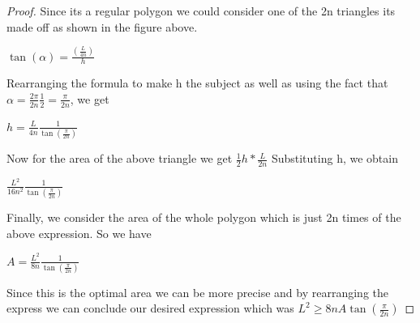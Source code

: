 \documentclass[a4paper]{book}
\numberwithin{theorem}{section}%
\begin{document}
\begin{proof}
        Since its a regular polygon we could consider one of the 2n triangles its made off as shown in the figure above. 
    \begin{center}
        $\displaystyle \tan(\alpha)=\frac{(\frac{L}{4n})}{h}$
    \end{center}
        Rearranging the formula to make h the subject as well as using the fact that $\alpha=\frac{2\pi}{2n} \frac{1}{2}=\frac{\pi}{2n}$, we get 
    \begin{center}
        $\displaystyle h=\frac{L}{4n} \frac{1}{\tan(\frac{\pi}{2n})}$
    \end{center}
    Now for the area of the above triangle we get $\displaystyle \frac{1}{2}h*\frac{L}{2n}$
        Substituting h, we obtain
    \begin{center}
        $\displaystyle \frac{L^{2}}{16n^{2}} \frac{1}{\tan(\frac{\pi}{2n})}$
    \end{center}
        Finally, we consider the area of the whole polygon which is just 2n times of the above expression. So we have 
    \begin{center}
            $\displaystyle A=\frac{L^{2}}{8n} \frac{1}{\tan(\frac{\pi}{2n})}$
    \end{center}
        Since this is the optimal area we can be more precise and by rearranging the express we can conclude our desired expression which was $L^{2} \ge 8nA\tan(\frac{\pi}{2n})$
\end{proof}
\end{document}
